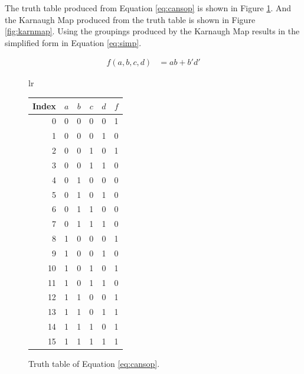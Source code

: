 \documentclass[12pt]{article}
\begin{document}
The truth table produced from Equation \ref{eq:cansop}
is shown in Figure \ref{fig:tt}.
And the Karnaugh Map produced from the truth table
is shown in Figure \ref{fig:karnmap}.
Using the groupings produced by the Karnaugh Map
results in the simplified form in Equation \ref{eq:simp}.

\begin{align}
f(a, b, c, d) &= ab + b'd' \label{eq:simp}
\end{align}

\begin{figure}[!hbt]
\begin{center}

\begin{tabular}{lr}
  \begin{tabular}[t]{r|cccc|c}
Index&$a$&$b$&$c$&$d$&$f$\\
\hline
0  &0&0&0&0 &1\\
1  &0&0&0&1 &0\\
2  &0&0&1&0 &1\\
3  &0&0&1&1 &0\\
4  &0&1&0&0 &0\\
5  &0&1&0&1 &0\\
6  &0&1&1&0 &0\\
7  &0&1&1&1 &0\\
8  &1&0&0&0 &1\\
9  &1&0&0&1 &0\\
10 &1&0&1&0 &1\\
11 &1&0&1&1 &0\\
12 &1&1&0&0 &1\\
13 &1&1&0&1 &1\\
14 &1&1&1&0 &1\\
15 &1&1&1&1 &1\\

  \end{tabular}
\end{tabular}
\end{center}

\caption{Truth table of Equation \ref{eq:cansop}.}
\label{fig:tt}
\end{figure}
\end{document}
